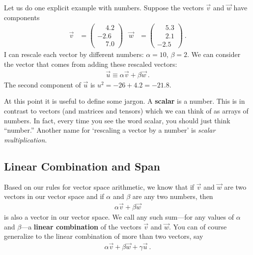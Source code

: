 \documentclass[12pt]{article}
\begin{document}
\begin{example}
Let us do one explicit example with numbers. Suppose the vectors $\vec{v}$ and $\vec{w}$ have components
\begin{align}
    \vec{v} &=
    \begin{pmatrix}
    \phantom{+}4.2\\
    -2.6\\
    \phantom{+}7.0        
    \end{pmatrix}
    &
    \vec{w} &=
    \begin{pmatrix}
    \phantom{+}5.3\\
    \phantom{+}2.1\\
    -2.5        
    \end{pmatrix} \ .
\end{align}
I can rescale each vector by different numbers: $\alpha = 10$, $\beta = 2$. We can consider the vector that comes from adding these rescaled vectors:
\begin{align}
    \vec{u} \equiv \alpha \vec{v} + \beta \vec{w} \ .
\end{align}
The second component of $\vec{u}$ is $u^2 = -26 + 4.2 = -21.8$.
\end{example}

At this point it is useful to define some jargon. A \textbf{scalar} is a number. This is in contrast to vectors (and matrices and tensors) which we can think of as arrays of numbers. In fact, every time you see the word scalar, you should just think ``number.'' Another name for `rescaling a vector by a number' is \emph{scalar multiplication}.



\subsection{Linear Combination and Span}

Based on our rules for vector space arithmetic, we know that if $\vec{v}$ and $\vec{w}$ are two vectors in our vector space and if $\alpha$ and $\beta$ are any two numbers, then
\begin{align}
    \alpha\vec{v} + \beta\vec{w} 
\end{align}
is also a vector in our vector space. We call any such sum---for any values of $\alpha$ and $\beta$---a \textbf{linear combination} of the vectors $\vec{v}$ and $\vec{w}$. You can of course generalize to the linear combination of more than two vectors, say
\begin{align}
    \alpha\vec{v} + \beta\vec{w} + \gamma\vec{u} \ .
\end{align}
\end{document}
